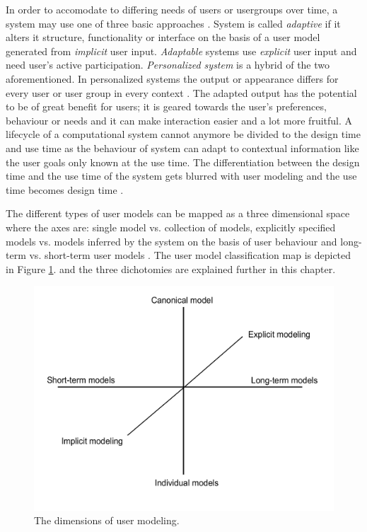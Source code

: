 \documentclass{sigchi}
\begin{document}
In order to accomodate to differing needs of users or usergroups over time, a system may use one of three basic approaches \cite{van08}. System is called \textit{adaptive} if it alters it structure, functionality or interface on the basis of a user model generated from \textit{implicit} user input. \textit{Adaptable} systems use \textit{explicit} user input and need user's active participation. \textit{Personalized system} is a hybrid of the two aforementioned. In personalized systems the output or appearance differs for every user or user group in every context \cite{van08}. The adapted output has the potential to be of great benefit for users; it is geared towards the user's preferences, behaviour or needs and it can make interaction easier and a lot more fruitful. A lifecycle of a computational system cannot anymore be divided to the design time and use time as the behaviour of system can adapt to contextual information like the user goals only known at the use time. The differentiation between the design time and the use time of the system gets blurred with user modeling and the use time becomes design time \cite{fischer01}.

The different types of user models can be mapped as a three dimensional space where the axes are: single model vs. collection of models, explicitly specified models vs. models inferred by the system on the basis of user behaviour and long-term vs. short-term user models \cite{rich99}. The user model classification map is depicted in Figure \ref{dim_UM}. and the three dichotomies are explained further in this chapter. 

\begin{figure}[htp] %
\caption{The dimensions of user modeling.} \label{dim_UM}
\includegraphics[scale=0.4]{figures/dimensions_UM.pdf} 
\end{figure}
\end{document}
